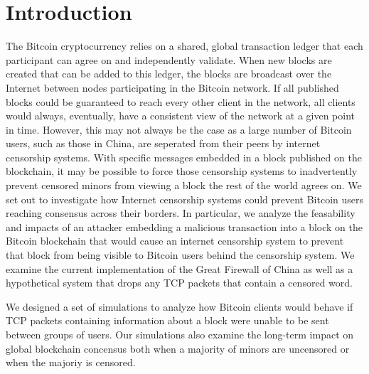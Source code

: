 \section{Introduction}
The Bitcoin cryptocurrency relies on a shared, global transaction ledger that each participant can agree on and independently validate. 
When new blocks are created that can be added to this ledger, the blocks are broadcast over the Internet between nodes participating in the Bitcoin network. 
If all published blocks could be guaranteed to reach every other client in the network, all clients would always, eventually, have a consistent view of the network at a given point in time. 
However, this may not always be the case as a large number of Bitcoin users, such as those in China, are seperated from their peers by internet censorship systems. 
With specific messages embedded in a block published on the blockchain, it may be possible to force those censorship systems to inadvertently prevent censored minors from viewing a block the rest of the world agrees on.
We set out to investigate how Internet censorship systems could prevent Bitcoin users reaching consensus across their borders.
In particular, we analyze the feasability and impacts of an attacker embedding a malicious transaction into a block on the Bitcoin blockchain that would cause an internet censorship system to prevent that block from being visible to Bitcoin users behind the censorship system.
We examine the current implementation of the Great Firewall of China as well as a hypothetical system that drops any TCP packets that contain a censored word.

We designed a set of simulations to analyze how Bitcoin clients would behave if TCP packets containing information about a block were unable to be sent between groups of users.
Our simulations also examine the long-term impact on global blockchain concensus both when a majority of minors are uncensored or when the majoriy is censored.

